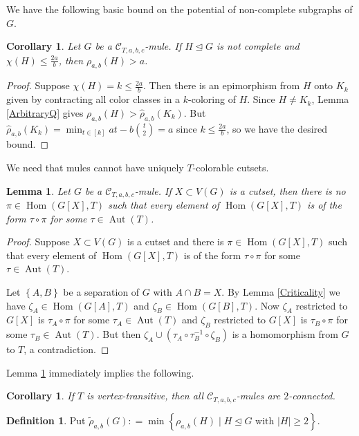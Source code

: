 \documentclass[12pt]{amsart}
\theoremstyle{plain}
\newtheorem{lem}[thm]{Lemma}
\newtheorem{cor}[thm]{Corollary}
\theoremstyle{definition}
\newtheorem{defn}{Definition}
\theoremstyle{remark}
\newcommand{\fancy}[1]{\mathcal{#1}}
\newcommand{\C}{\fancy{C}}
\newcommand{\set}[1]{\left\{ #1 \right\}}
\newcommand{\setbs}[2]{\left\{ #1 \mid #2 \right\}}
\newcommand{\irange}[1]{\left[#1\right]}
\newcommand{\DefinedAs}{\mathrel{\mathop:}=}
\renewcommand{\hom}{\operatorname{Hom}}
\newcommand{\aut}{\operatorname{Aut}}
\begin{document}
We have the following basic bound on the potential of non-complete subgraphs of $G$.
\begin{cor}\label{CompleteQ}
Let $G$ be a $\C_{T,a,b,c}$-mule. If $H \unlhd G$ is not complete and $\chi(H) \le \frac{2a}{b}$, then $\rho_{a,b}(H) > a$.
\end{cor}
\begin{proof}
Suppose $\chi(H) = k \le \frac{2a}{b}$.  Then there is an epimorphism from $H$ onto $K_k$ given by contracting all color classes in a $k$-coloring of $H$.  Since $H \ne K_k$, Lemma \ref{ArbitraryQ} gives
$\rho_{a,b}(H) > \hat{\rho}_{a,b}(K_k)$.  But $\hat{\rho}_{a,b}(K_k) = \min_{t \in \irange{k}} at - b\binom{t}{2} = a$ since $k \le \frac{2a}{b}$, so we have the desired bound.
\end{proof}

We need that mules cannot have uniquely $T$-colorable cutsets.
\begin{lem}\label{UniquelyColorable}
Let $G$ be a $\C_{T,a,b,c}$-mule.  If $X \subset V(G)$ is a cutset, then there is no $\pi \in \hom(G[X], T)$ such that every element of $\hom(G[X], T)$ is of the form $\tau \circ \pi$ for some $\tau \in \aut(T)$. 
\end{lem}
\begin{proof}
Suppose $X \subset V(G)$ is a cutset and there is $\pi \in \hom(G[X], T)$ such that every element of $\hom(G[X], T)$ is of the form $\tau \circ \pi$ for some $\tau \in \aut(T)$.   

Let $\set{A,B}$ be a separation of $G$ with $A \cap B = X$.  By Lemma \ref{Criticality} we have $\zeta_A \in \hom(G[A], T)$ and $\zeta_B \in \hom(G[B], T)$.  Now $\zeta_A$ restricted to $G[X]$ is $\tau_A \circ \pi$ for some $\tau_A \in \aut(T)$ and $\zeta_B$ restricted to $G[X]$ is $\tau_B \circ \pi$ for some $\tau_B \in \aut(T)$.  But then $\zeta_A \cup (\tau_A \circ \tau_B^{-1} \circ \zeta_B)$ is a homomorphism from $G$ to $T$, a contradiction.
\end{proof}

Lemma \ref{UniquelyColorable} immediately implies the following.
\begin{cor}\label{TwoConnected}
If $T$ is vertex-transitive, then all $\C_{T,a,b,c}$-mules are $2$-connected. 
\end{cor}

\begin{defn}
Put $\tilde{\rho}_{a,b}(G) \DefinedAs \min\setbs{\rho_{a,b}(H)}{H \unlhd G \text{ with } |H| \ge 2}$.
\end{defn}
\end{document}
